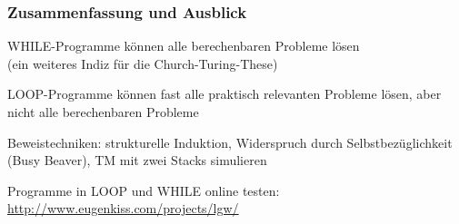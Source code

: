 \documentclass[onlymath]{beamer}
\begin{document}
\begin{frame}\frametitle{Zusammenfassung und Ausblick}

WHILE-Programme können alle berechenbaren Probleme lösen\\
(ein weiteres Indiz für die Church-Turing-These)
\bigskip

LOOP-Programme können fast alle praktisch relevanten Probleme lösen,
aber nicht alle berechenbaren Probleme
\bigskip

Beweistechniken: strukturelle Induktion, Widerspruch durch Selbstbezüglichkeit (Busy Beaver), TM mit zwei Stacks simulieren\bigskip

Programme in LOOP und WHILE online testen:\\
\url{http://www.eugenkiss.com/projects/lgw/}\bigskip


\end{frame}

% 
% 
\end{document}
